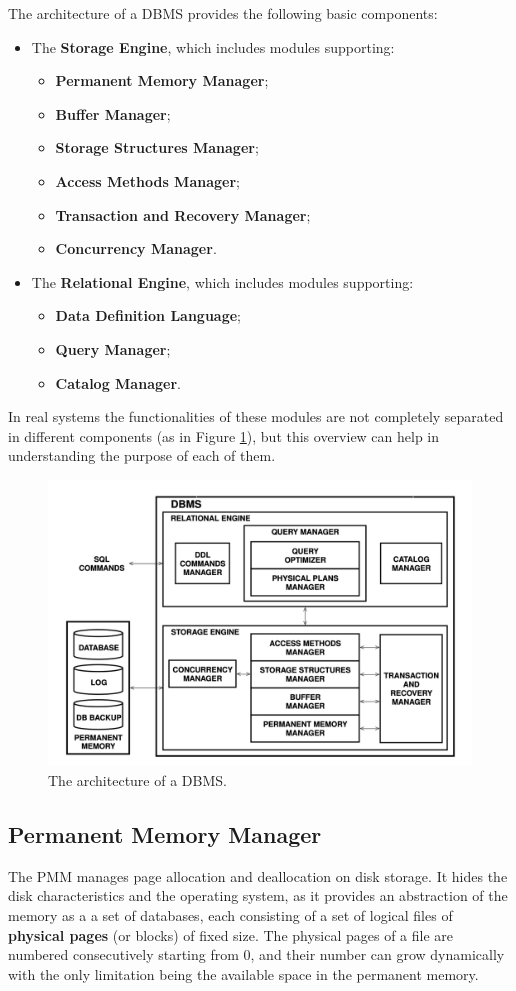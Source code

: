 The architecture of a DBMS provides the following basic components:
\begin{itemize}
    \item The \textbf{Storage Engine}, which includes modules supporting:
    \begin{itemize}
        \item \textbf{Permanent Memory Manager};
        \item \textbf{Buffer Manager};
        \item \textbf{Storage Structures Manager};
        \item \textbf{Access Methods Manager};
        \item \textbf{Transaction and Recovery Manager};
        \item \textbf{Concurrency Manager}.
    \end{itemize}

    \item The \textbf{Relational Engine}, which includes modules supporting:
    \begin{itemize}
        \item \textbf{Data Definition Language};
        \item \textbf{Query Manager};
        \item \textbf{Catalog Manager}.
    \end{itemize}
\end{itemize}
In real systems the functionalities of these modules are not completely separated in different components (as in Figure \ref{fig:DBMS_schema}), but this overview can help in understanding the purpose of each of them. 

\begin{figure}[h]
    \centering
    \includegraphics[width=0.75\linewidth]{img/DBMS schema.png}
    \caption{The architecture of a DBMS.}
    \label{fig:DBMS_schema}
\end{figure}

\subsection{Permanent Memory Manager}

The PMM manages page allocation and deallocation on disk storage. It hides the disk characteristics and the operating system, as it provides an abstraction of the memory as a a set of databases, each consisting of a set of logical files of \textbf{physical pages} (or blocks) of fixed size. The physical pages of a file are numbered consecutively starting from 0, and their number can grow dynamically with the only limitation being the available space in the permanent memory.